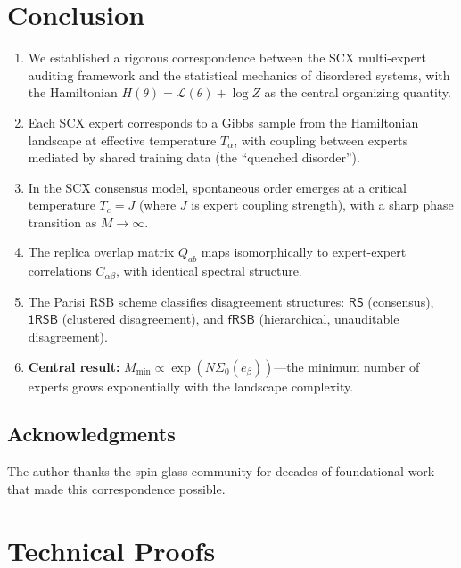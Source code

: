 \documentclass[12pt,a4paper]{article}
\newcommand{\loss}{\mathcal{L}}
\newcommand{\RS}{\mathsf{RS}}
\newcommand{\oneRSB}{\mathsf{1RSB}}
\newcommand{\fRSB}{\mathsf{fRSB}}
\begin{document}
\section{Conclusion}
\begin{enumerate}
    \item We established a rigorous correspondence between the SCX multi-expert auditing framework and the statistical mechanics of disordered systems, with the Hamiltonian \(H(\theta) = \loss(\theta) + \log Z\) as the central organizing quantity.
    \item Each SCX expert corresponds to a Gibbs sample from the Hamiltonian landscape at effective temperature \(T_\alpha\), with coupling between experts mediated by shared training data (the ``quenched disorder'').
    \item In the SCX consensus model, spontaneous order emerges at a critical temperature \(T_c = J\) (where \(J\) is expert coupling strength), with a sharp phase transition as \(M \to \infty\).
    \item The replica overlap matrix \(Q_{ab}\) maps isomorphically to expert-expert correlations \(C_{\alpha\beta}\), with identical spectral structure.
    \item The Parisi RSB scheme classifies disagreement structures: \(\RS\) (consensus), \(\oneRSB\) (clustered disagreement), and \(\fRSB\) (hierarchical, unauditable disagreement).
    \item \textbf{Central result:} \(M_{\min} \propto \exp(N \Sigma_0(e_\beta))\)---the minimum number of experts grows exponentially with the landscape complexity.
\end{enumerate}

\subsection*{Acknowledgments}
The author thanks the spin glass community for decades of foundational work that made this correspondence possible.

\appendix
\section{Technical Proofs}
\end{document}
